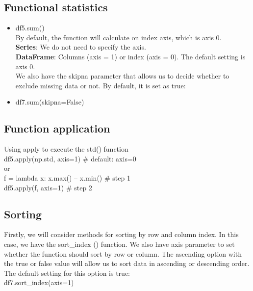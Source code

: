 \documentclass{article}
\numberwithin{equation}{section} %
\begin{document}
\subsection*{Functional statistics}

\begin{itemize}
	\item df5.sum()\\
	By default, the function will calculate on index axis, which is axis 0. \\
	\textbf{Series}: We do not need to specify the axis. \\
	\textbf{DataFrame}: Columns (axis = 1) or index (axis = 0). The default setting is
	axis 0.\\
	We also have the skipna parameter that allows us to decide whether to exclude
	missing data or not. By default, it is set as true: 
	\item df7.sum(skipna=False)
\end{itemize}

\subsection*{Function application}

Using apply to execute the std() function \\

df5.apply(np.std, axis=1)	\hspace{2cm}	\# default: axis=0\\
or\\
f = lambda x: x.max() – x.min()		\hspace{2cm} \# step 1\\
df5.apply(f, axis=1)				\hspace{2cm} \# step 2\\

\subsection*{Sorting}

Firstly, we will consider methods for sorting by row and column index. In this case,
we have the sort\_index () function. We also have axis parameter to set whether
the function should sort by row or column. The ascending option with the true or
false value will allow us to sort data in ascending or descending order. The default
setting for this option is true:\\

df7.sort\_index(axis=1)\\
\end{document}
